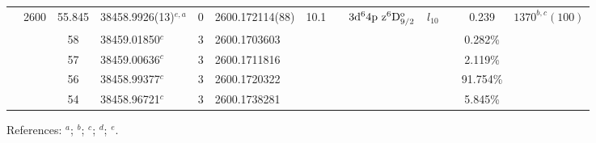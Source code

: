 \begin{table*}
\begin{center}
{\begin{tabular}{:l;l;c;l;c;l;c;l;l;c;c;c;c}
                                  & 2600   & 55.845    & 38458.9926(13)$^{e,a}$           & 0 &   2600.172114(88)  & 10.1 & $                                        $ & $3\rm{d}^64\rm{p~z}^6\rm{D}_{9/2}^{\rm o}$ & $l_{10}$ &              & 0.239     & $ 1370^{b,c}(100)$\\
\rowstyle{\itshape}               &        & 58        & 38459.01850$^{c}$                & 3 &  2600.1703603      &      & $                                        $ & $                                        $ & $      $ &              & 0.282\%   & $     ^{}     $\\
\rowstyle{\itshape}               &        & 57        & 38459.00636$^{c}$                & 3 &  2600.1711816      &      & $                                        $ & $                                        $ & $      $ &              & 2.119\%   & $     ^{}     $\\
\rowstyle{\itshape}               &        & 56        & 38458.99377$^{c}$                & 3 &  2600.1720322      &      & $                                        $ & $                                        $ & $      $ &              & 91.754\%  & $     ^{}     $\\
\rowstyle{\itshape}               &        & 54        & 38458.96721$^{c}$                & 3 &  2600.1738281      &      & $                                        $ & $                                        $ & $      $ &              & 5.845\%   & $     ^{}     $\\
\hline
\end{tabular}
}
{\footnotesize References:
$^{a}$\citet{Nave:2012:1570};
$^{b}$\citet{Dzuba:2002:022501};
$^{c}$\citet{Porsev:2009:032519};
$^{d}$\citet{Berengut:2006:PhD};
$^{e}$\citet{Aldenius:2009:014008}.}
\end{center}
\end{table*}
